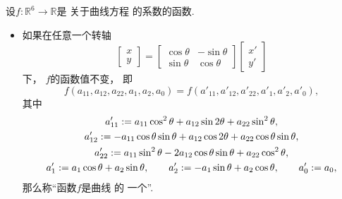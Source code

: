 \begin{definition}
设\(f\colon \mathbb{R}^6 \to \mathbb{R}\)是
关于曲线方程  的系数的函数.
\begin{itemize}
	\item 如果在任意一个转轴\begin{equation*}
		\begin{bmatrix}
			x \\ y
		\end{bmatrix}
		= \begin{bmatrix}
			\cos\theta & -\sin\theta \\
			\sin\theta & \cos\theta
		\end{bmatrix}
		\begin{bmatrix}
			x' \\ y'
		\end{bmatrix}
	\end{equation*}下，
	\(f\)的函数值不变，
	即\begin{equation*}
		f(a_{11},a_{12},a_{22},a_1,a_2,a_0)
		= f(a'_{11},a'_{12},a'_{22},a'_1,a'_2,a'_0),
	\end{equation*}
	其中\begin{gather*}
		a'_{11} := a_{11} \cos^2\theta + a_{12} \sin2\theta + a_{22} \sin^2\theta, \\
		a'_{12} := - a_{11} \cos\theta \sin\theta + a_{12} \cos2\theta + a_{22} \cos\theta \sin\theta, \\
		a'_{22} := a_{11} \sin^2\theta - 2 a_{12} \cos\theta \sin\theta + a_{22} \cos^2\theta, \\
		a'_1 := a_1 \cos\theta + a_2 \sin\theta,
		\qquad
		a'_2 := - a_1 \sin\theta + a_2 \cos\theta,
		\qquad
		a'_0 := a_0,
	\end{gather*}
	那么称“函数\(f\)是曲线  的
	一个”.


\end{itemize}
\end{definition}

